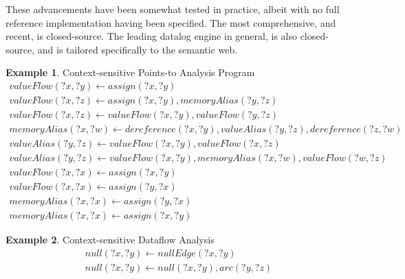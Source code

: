 \documentclass[sigconf,screen,review,natbib]{acmart}
\theoremstyle{definition}
\newtheorem{exmp}{Example}[section]
\begin{document}
These advancements have been somewhat tested in practice, albeit with no full reference implementation having been specified. The most comprehensive, and recent, is closed-source\cite{vadalog}.
The leading datalog engine in general, is also closed-source\cite{rdfox}, and is tailored specifically to the semantic web.

\begin{exmp}{Context-sensitive Points-to Analysis Program}
	\tiny
	\begin{align}
		valueFlow(?x, ?y) \leftarrow assign(?x, ?y)                                                 \\
		valueFlow(?x, ?z) \leftarrow assign(?x, ?y), memoryAlias(?y, ?z)                            \\
		valueFlow(?x, ?z) \leftarrow valueFlow(?x, ?y), valueFlow(?y, ?z)                           \\
		memoryAlias(?x, ?w) \leftarrow dereference(?x, ?y), valueAlias(?y, ?z), dereference(?z, ?w) \\
		valueAlias(?y, ?z) \leftarrow valueFlow(?x, ?y), valueFlow(?x, ?z)                          \\
		valueAlias(?y, ?z) \leftarrow valueFlow(?x, ?y), memoryAlias(?x, ?w), valueFlow(?w, ?z)     \\
		valueFlow(?x, ?x) \leftarrow assign(?x, ?y)                                                 \\
		valueFlow(?x, ?x) \leftarrow assign(?y, ?x)                                                 \\
		memoryAlias(?x, ?x) \leftarrow assign(?y, ?x)                                               \\
		memoryAlias(?x, ?x) \leftarrow assign(?x, ?y)
	\end{align}
	\label{program:cspa}
\end{exmp}

\begin{exmp}{Context-sensitive Dataflow Analysis}
	\tiny
	\begin{align}
		null(?x, ?y) \leftarrow nullEdge(?x, ?y) \\
		null(?x, ?y) \leftarrow null(?x, ?y), arc(?y, ?z)
	\end{align}
	\label{program:csda}
\end{exmp}
\end{document}
